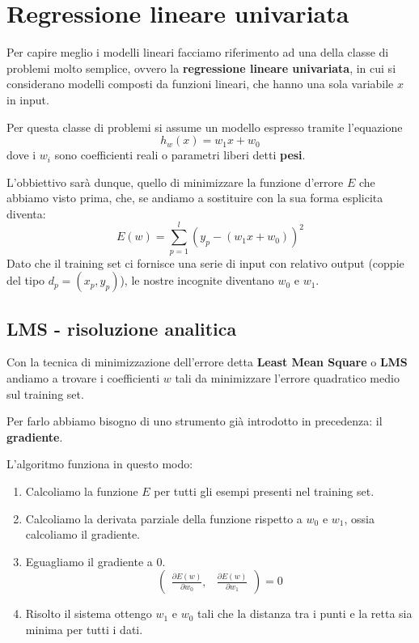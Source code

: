 \section{Regressione lineare univariata}
Per capire meglio i modelli lineari facciamo riferimento ad una della classe di problemi molto semplice, ovvero
la \textbf{regressione lineare univariata}, in cui si considerano modelli composti da funzioni lineari, che hanno una
sola variabile $x$ in input.

Per questa classe di problemi si assume un modello espresso tramite l'equazione
\[ h_w(x) = w_1 x + w_0 \]
dove i $w_i$ sono coefficienti reali o parametri liberi detti \textbf{pesi}.

L'obbiettivo sar\`a dunque, quello di minimizzare la funzione d'errore $E$ che abbiamo visto prima, che, se andiamo a
sostituire con la sua forma esplicita diventa:
\[ E(w) = \sum_{p=1}^l (y_p - (w_1 x + w_0))^2 \]
Dato che il training set ci fornisce una serie di input con relativo output (coppie del tipo $d_p = (x_p, y_p)$), le nostre
incognite diventano $w_0$ e $w_1$.

\subsection{LMS - risoluzione analitica}
Con la tecnica di minimizzazione dell'errore detta \textbf{Least Mean Square} o \textbf{LMS} andiamo a trovare i
coefficienti $w$ tali da minimizzare l'errore quadratico medio sul training set.

Per farlo abbiamo bisogno di uno strumento gi\`a introdotto in precedenza: il \textbf{gradiente}.

L'algoritmo funziona in questo modo:
\begin{enumerate}
	\item Calcoliamo la funzione $E$ per tutti gli esempi presenti nel training set.
	\item Calcoliamo la derivata parziale della funzione rispetto a $w_0$ e $w_1$, ossia calcoliamo il gradiente.
	\item Eguagliamo il gradiente a 0.
	      \[
		      \begin{pmatrix}
			      \displaystyle\frac{ \partial E(w) }{ \partial w_0 }, &
			      \displaystyle\frac{ \partial E(w) }{ \partial w_1 }
		      \end{pmatrix} = 0
	      \]
	\item Risolto il sistema ottengo $w_1$ e $w_0$ tali che la distanza tra i punti e la retta sia minima per tutti i dati.
\end{enumerate}


